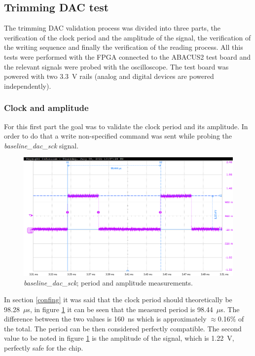 \subsection{Trimming DAC test}\label{dactests}
The trimming DAC validation process was divided into three parts, the verification of the clock period and the amplitude of the signal, the verification of the writing sequence and finally the verification of the reading process. 
All this tests were performed with the FPGA connected to the ABACUS2 test board and the relevant signals were probed with the oscilloscope. The test board was powered with two 3.3~V rails (analog and digital devices are powered independently).
\subsubsection{Clock and amplitude}
For this first part the goal was to validate the clock period and its amplitude. In order to do that a write non-specified command was sent while probing the \textit{baseline\_dac\_sck} signal. 
\begin{figure}[H]
	\centering
	\includegraphics[width=0.7\linewidth]{IMG/ch5/probe/09-08-2021_clock-specks}
	\caption{\textit{baseline\_dac\_sck}; period and amplitude measurements.}
	\label{fig:clockspecs}
\end{figure}
\noindent In section \ref{confing} it was said that the clock period should theoretically be 98.28~$\mu$s, in figure \ref{fig:clockspecs} it can be seen that the measured period is 98.44~$\mu$s. The difference between the two values is 160~ns which is approximately $\approx$0.16\% of the total. The period can be then considered perfectly compatible.
The second value to be noted in figure \ref{fig:clockspecs} is the amplitude of the signal, which is 1.22~V, perfectly safe for the chip. 

